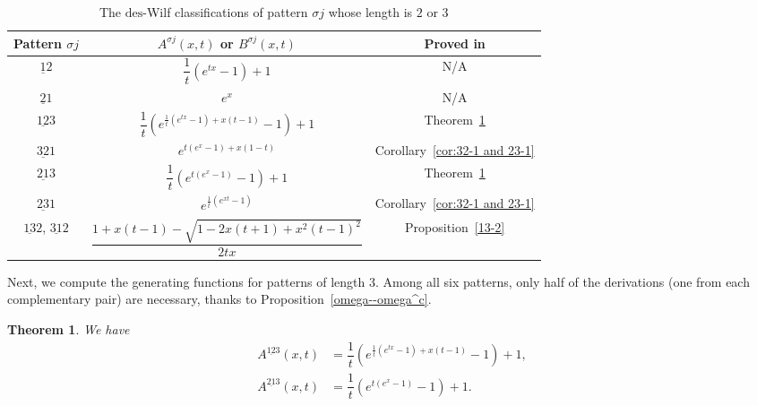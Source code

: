 \documentclass[11pt,reqno]{amsart}
\numberwithin{equation}{section}
\theoremstyle{plain}
\newtheorem{theorem}{Theorem}[section]
\theoremstyle{definition}
\def\des{\mathrm{des}}
\begin{document}
\begin{table}[h!]
    \setlength{\tabcolsep}{15pt}    
    \renewcommand{\arraystretch}{1.2}   
    \begin{center}
     \begin{tabular}{c|c|c} 
        Pattern $\sigma j$  & $A^{\sigma j}(x,t)$ or $B^{\sigma j}(x,t)$ & Proved in \\ \hline 
        $\underline{1}2$ & $\dfrac{1}{t}(e^{tx}-1)+1$ & N/A  \\ 
        $\underline{2}1$ & $e^{x}$ & N/A  \\ 
        $\underline{12}3$ & $\dfrac{1}{t} (e^{\frac{1}{t}(e^{tx}-1)+x(t-1)}-1)+1$ & Theorem~\ref{thm:12-3 and 21-3} \\ 
        $\underline{32}1$ & $e^{t(e^{x}-1)+x(1-t)}$ & Corollary~\ref{cor:32-1 and 23-1} \\ 
        $\underline{21}3$ & $\dfrac{1}{t} (e^{t(e^x-1)}-1)+1$ & Theorem~\ref{thm:12-3 and 21-3} \\ 
        $\underline{23}1$ & $e^{\frac{1}{t}(e^{xt}-1)}$ &  Corollary~\ref{cor:32-1 and 23-1} \\ 
        $\underline{13}2$, $\underline{31}2$ & $\dfrac{1+x(t-1)-\sqrt{1-2x(t+1)+x^2(t-1)^2}}{2tx}$ &  Proposition~\ref{13-2}
        \end{tabular}
  \end{center}
  \caption{The $\des$-Wilf classifications of pattern $\sigma j$ whose length is $2$ or $3$}
  \label{tab:2 and 3}
\end{table}

















Next, we compute the generating functions for patterns of length 3. Among all six patterns, only half of the derivations (one from each complementary pair) are necessary, thanks to Proposition~\ref{omega--omega^c}.

\begin{theorem} \label{thm:12-3 and 21-3}
    We have
    \begin{align*}
    A^{\underline{12}3}(x,t) &= \dfrac{1}{t} (e^{\frac{1}{t}(e^{tx}-1)+x(t-1)}-1)+1,\\
    A^{\underline{21}3}(x,t) &= \dfrac{1}{t} (e^{t(e^x-1)}-1)+1.
    \end{align*}
\end{theorem}
\end{document}
